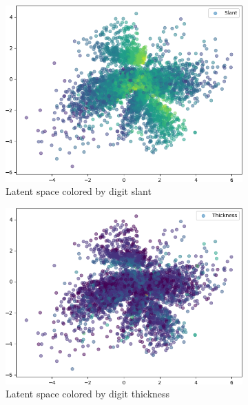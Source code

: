 \documentclass[11pt]{article}
\begin{document}
\begin{figure}[H]
\centering
\begin{subfigure}{.32\textwidth}
\includegraphics[width=\textwidth]{images/latent_spaces/mnist/vae_gan/embeddings_mu_0.png}
\caption{Latent space colored by digit slant}
\label{subfig:vae_mnist_latent_space_slant}
\end{subfigure}
\hfill
\begin{subfigure}{.32\textwidth}
\includegraphics[width=\textwidth]{images/latent_spaces/mnist/vae_gan/embeddings_mu_1.png}
\caption{Latent space colored by digit thickness}
\label{subfig:vae_mnist_latent_space_thickness}
\end{subfigure}
\hfill
\begin{subfigure}{.32\textwidth}

\end{subfigure}
\end{figure}
\end{document}
